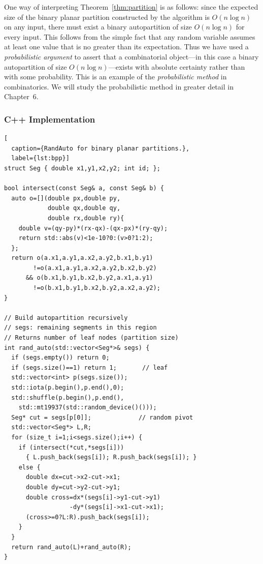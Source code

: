 \documentclass[twoside,12pt]{book}
\theoremstyle{plain}
\theoremstyle{definition}
\theoremstyle{remark}
\begin{document}
One way of interpreting Theorem~\ref{thm:partition} is as follows: since the
expected size of the binary planar partition constructed by the algorithm is
$O(n\log n)$ on any input, there must exist a binary autopartition of size
$O(n\log n)$ for every input.  This follows from the simple fact that any
random variable assumes at least one value that is no greater than its
expectation.  Thus we have used a \emph{probabilistic argument} to assert
that a combinatorial object---in this case a binary autopartition of size
$O(n\log n)$---exists with absolute certainty rather than with some
probability.  This is an example of the \emph{probabilistic method} in
combinatorics.  We will study the probabilistic method in greater detail in
Chapter~6.

\subsubsection*{C++ Implementation}

\begin{lstlisting}[
  caption={RandAuto for binary planar partitions.},
  label={lst:bpp}]
struct Seg { double x1,y1,x2,y2; int id; };

bool intersect(const Seg& a, const Seg& b) {
  auto o=[](double px,double py,
            double qx,double qy,
            double rx,double ry){
    double v=(qy-py)*(rx-qx)-(qx-px)*(ry-qy);
    return std::abs(v)<1e-10?0:(v>0?1:2);
  };
  return o(a.x1,a.y1,a.x2,a.y2,b.x1,b.y1)
        !=o(a.x1,a.y1,a.x2,a.y2,b.x2,b.y2)
      && o(b.x1,b.y1,b.x2,b.y2,a.x1,a.y1)
        !=o(b.x1,b.y1,b.x2,b.y2,a.x2,a.y2);
}

// Build autopartition recursively
// segs: remaining segments in this region
// Returns number of leaf nodes (partition size)
int rand_auto(std::vector<Seg*>& segs) {
  if (segs.empty()) return 0;
  if (segs.size()==1) return 1;       // leaf
  std::vector<int> p(segs.size());
  std::iota(p.begin(),p.end(),0);
  std::shuffle(p.begin(),p.end(),
    std::mt19937(std::random_device()()));
  Seg* cut = segs[p[0]];             // random pivot
  std::vector<Seg*> L,R;
  for (size_t i=1;i<segs.size();i++) {
    if (intersect(*cut,*segs[i]))
      { L.push_back(segs[i]); R.push_back(segs[i]); }
    else {
      double dx=cut->x2-cut->x1;
      double dy=cut->y2-cut->y1;
      double cross=dx*(segs[i]->y1-cut->y1)
                  -dy*(segs[i]->x1-cut->x1);
      (cross>=0?L:R).push_back(segs[i]);
    }
  }
  return rand_auto(L)+rand_auto(R);
}
\end{lstlisting}
\end{document}
